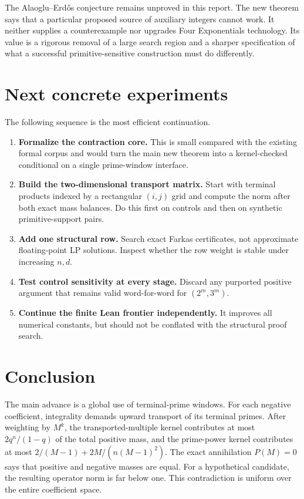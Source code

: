 \documentclass[11pt,oneside]{article}
\theoremstyle{definition}
\theoremstyle{remark}
\begin{document}
\begin{warningbox}
The Alaoglu--Erd\H{o}s conjecture remains unproved in this report.  The new theorem says that
a particular proposed source of auxiliary integers cannot work.  It neither supplies a
counterexample nor upgrades Four Exponentials technology.  Its value is a rigorous removal
of a large search region and a sharper specification of what a successful primitive-sensitive
construction must do differently.
\end{warningbox}

\section{Next concrete experiments}
\label{sec:next}

The following sequence is the most efficient continuation.

\begin{enumerate}
\item \textbf{Formalize the contraction core.}  This is small compared with the existing
formal corpus and would turn the main new theorem into a kernel-checked conditional on a
single prime-window interface.
\item \textbf{Build the two-dimensional transport matrix.}  Start with terminal products
indexed by a rectangular $(i,j)$ grid and compute the norm after both exact mass balances.
Do this first on controls and then on synthetic primitive-support pairs.
\item \textbf{Add one structural row.}  Search exact Farkas certificates, not approximate
floating-point LP solutions.  Inspect whether the row weight is stable under increasing
$n,d$.
\item \textbf{Test control sensitivity at every stage.}  Discard any purported positive
argument that remains valid word-for-word for $(2^m,3^m)$.
\item \textbf{Continue the finite Lean frontier independently.}  It improves all numerical
constants, but should not be conflated with the structural proof search.
\end{enumerate}

\section{Conclusion}
\label{sec:conclusion}

The main advance is a global use of terminal-prime windows.  For each negative coefficient,
integrality demands upward transport of its terminal primes.  After weighting by $M^k$, the
transported-multiple kernel contributes at most $2q^n/(1-q)$ of the total positive mass, and
the prime-power kernel contributes at most
$2/(M-1)+2M/(n(M-1)^2)$.  The exact annihilation $P(M)=0$ says that positive and negative
masses are equal.  For a hypothetical candidate, the resulting operator norm is far below
one.  This contradiction is uniform over the entire coefficient space.
\end{document}
